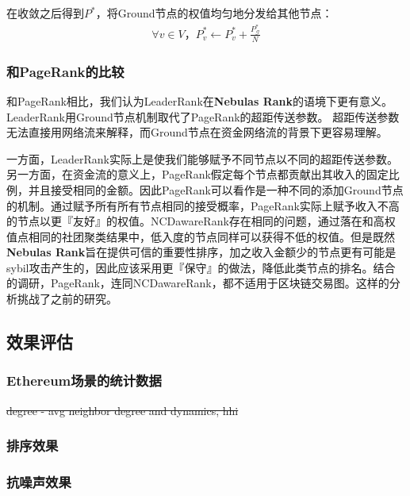 在收敛之后得到$P^*$，将Ground节点的权值均匀地分发给其他节点：
\begin{align}
\forall v \in V， P^*_v \leftarrow P^*_v + \frac{P^*_{\mathcal{G}}}{N}
\end{align}


\subsubsection{和PageRank的比较}
和PageRank相比，我们认为LeaderRank在\textbf{Nebulas Rank}的语境下更有意义。LeaderRank用Ground节点机制取代了PageRank的超距传送参数\cite{Brin2010}\cite{page1999pagerank}。 超距传送参数无法直接用网络流来解释，而Ground节点在资金网络流的背景下更容易理解。

一方面，LeaderRank实际上是使我们能够赋予不同节点以不同的超距传送参数。另一方面，在资金流的意义上，PageRank假定每个节点都贡献出其收入的固定比例，并且接受相同的金额。因此PageRank可以看作是一种不同的添加Ground节点的机制。通过赋予所有所有节点相同的接受概率，PageRank实际上赋予收入不高的节点以更『友好』的权值。NCDawareRank\cite{Nikolakopoulos2013}存在相同的问题，通过落在和高权值点相同的社团聚类结果中，低入度的节点同样可以获得不低的权值。但是既然\textbf{Nebulas Rank}旨在提供可信的重要性排序，加之收入金额少的节点更有可能是sybil攻击产生的，因此应该采用更『保守』的做法，降低此类节点的排名。结合 的调研，PageRank，连同NCDawareRank，都不适用于区块链交易图。这样的分析挑战了之前的研究\cite{Fleder2015}\cite{nem}。

\subsection{效果评估} \label{sec:exp}

\subsubsection{Ethereum场景的统计数据}
\st{degree - avg neighbor degree and dynamics, hhi}
\subsubsection{排序效果}
\subsubsection{抗噪声效果}
